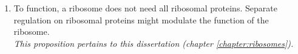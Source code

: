 \begin{enumerate}[nosep]
    \item
    To function, a ribosome does not need all ribosomal proteins.  
    Separate regulation on ribosomal proteins might modulate the function of the ribosome.\\ 
    \textit{This proposition pertains to this dissertation (chapter \ref{chapter:ribosomes}).}
\end{enumerate}


